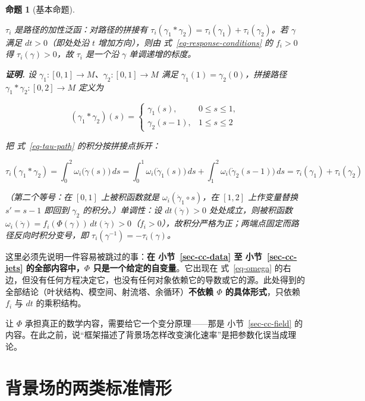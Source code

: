 \documentclass[
  chinese,
  a4paper,
  UTF8,
  12pt,
  oneside,
  openany]{ctexbook}
\theoremstyle{plain}
\theoremstyle{plain}
\theoremstyle{plain}
\newtheorem{proposition}{命题}[chapter]
\theoremstyle{definition}
\theoremstyle{plain}
\theoremstyle{plain}
\theoremstyle{remark}
\begin{document}
\begin{proposition}[基本命题]\protect\hypertarget{prp-data}{}\label{prp-data}

\(\tau_i\) 是路径的加性泛函：对路径的拼接有
\(\tau_i(\gamma_1 * \gamma_2) = \tau_i(\gamma_1)+\tau_i(\gamma_2)\)。若
\(\gamma\) 满足 \(dt > 0\)（即处处沿 \(t\) 增加方向），则由
式~\ref{eq-response-conditions} 的 \(f_i>0\) 得
\(\tau_i(\gamma) > 0\)，故 \(\tau_i\) 是一个沿 \(\gamma\)
单调递增的标度。

\textbf{证明.} 设 \(\gamma_1:[0,1]\to M\)、\(\gamma_2:[0,1]\to M\) 满足
\(\gamma_1(1)=\gamma_2(0)\)，拼接路径 \(\gamma_1*\gamma_2:[0,2]\to M\)
定义为

\[
(\gamma_1*\gamma_2)(s)=
\begin{cases}
\gamma_1(s), & 0\le s\le1,\\
\gamma_2(s-1), & 1\le s\le2
\end{cases}
\]

把 式~\ref{eq-tau-path} 的积分按拼接点拆开：

\[
\tau_i(\gamma_1*\gamma_2)
=\int_{0}^{2}\omega_i\bigl(\dot\gamma(s)\bigr)\,ds
=\int_{0}^{1}\omega_i\bigl(\dot\gamma_1(s)\bigr)\,ds
+\int_{1}^{2}\omega_i\bigl(\dot\gamma_2(s-1)\bigr)\,ds
=\tau_i(\gamma_1)+\tau_i(\gamma_2)
\]

（第二个等号：在 \([0,1]\) 上被积函数就是
\(\omega_i(\dot\gamma_1\circ s)\)，在 \([1,2]\) 上作变量替换 \(s'=s-1\)
即回到 \(\gamma_2\) 的积分。）单调性：设 \(dt(\dot\gamma)>0\)
处处成立，则被积函数
\(\omega_i(\dot\gamma)=f_i(\Phi(\gamma))\,dt(\dot\gamma)>0\)（\(f_i>0\)），故积分严格为正；两端点固定而路径反向时积分变号，即
\(\tau_i(\gamma^{-1})=-\tau_i(\gamma)\)。

\end{proposition}

这里必须先说明一件容易被跳过的事：\textbf{在 小节~\ref{sec-cc-data} 至
小节~\ref{sec-cc-jets} 的全部内容中，\(\Phi\)
只是一个给定的自变量}。它出现在 式~\ref{eq-omega}
的右边，但没有任何方程决定它，也没有任何对象依赖它的导数或它的源。此处得到的全部结论（叶状结构、模空间、射流塔、余循环）\textbf{不依赖
\(\Phi\) 的具体形式}，只依赖 \(f_i\) 与 \(dt\) 的乘积结构。

让 \(\Phi\) 承担真正的数学内容，需要给它一个变分原理------那是
小节~\ref{sec-cc-field}
的内容。在此之前，说``框架描述了背景场怎样改变演化速率''是把参数化误当成理论。

\section{背景场的两类标准情形}\label{sec-cc-fields}
\end{document}
